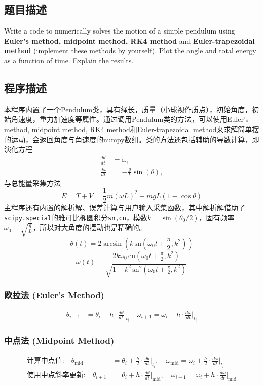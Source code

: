 \subsection{题目描述}
\noindent Write a code to numerically solves the motion of a simple pendulum using \textbf{Euler's method, midpoint method, RK4 method} and \textbf{Euler-trapezoidal method} (implement these methods by yourself). Plot the angle and total energy as a function of time. Explain the results.

\subsection{程序描述}
本程序内置了一个Pendulum类，具有绳长，质量（小球视作质点），初始角度，初始角速度，重力加速度等属性。通过调用Pendulum类的方法，可以使用Euler's method, midpoint method, RK4 method和Euler-trapezoidal method来求解简单摆的运动，会返回角度与角速度的numpy数组。类的方法还包括辅助的导数计算，即演化方程
\[
\begin{aligned}
\frac{d\theta}{dt} &= \omega, \\
\frac{d\omega}{dt} &= -\frac{g}{L} \sin(\theta),
\end{aligned}
\]
与总能量采集方法
\[
E = T + V = \frac{1}{2} m (\omega L)^2+ m g L (1 - \cos\theta)
\]
主程序还有内置的解析解、误差计算与用户输入采集函数，其中解析解借助了\texttt{scipy.special}的雅可比椭圆积分\texttt{sn,cn}，模数$k = \sin(\theta_0/2)$，固有频率$\omega_0 = \sqrt{\frac{g}{L}}$，所以对大角度的摆动也是精确的。
\[
\theta(t) = 2 \arcsin\left(k \, \text{sn}(\omega_0 t + \frac{\pi}{2}, k^2)\right)
\]
\[
\omega(t) = \frac{2 k \omega_0 \, \text{cn}(\omega_0 t + \frac{\pi}{2}, k^2)}{\sqrt{1 - k^2 \, \text{sn}^2(\omega_0 t + \frac{\pi}{2}, k^2)}}
\]

\subsubsection{欧拉法 (Euler’s Method)}

\[
\begin{aligned}
\theta_{i+1} &= \theta_i + h \cdot \frac{d\theta}{dt} \bigg|_{t_i} \quad
\omega_{i+1} = \omega_i + h \cdot \frac{d\omega}{dt} \bigg|_{t_i}
\end{aligned}
\]

\subsubsection{中点法 (Midpoint Method)}

\[
\begin{aligned}
\text{计算中点值:} \quad
\theta_{\text{mid}} &= \theta_i + \frac{h}{2} \cdot \frac{d\theta}{dt} \bigg|_{t_i}, \quad
\omega_{\text{mid}} = \omega_i + \frac{h}{2} \cdot \frac{d\omega}{dt} \bigg|_{t_i} \\
\text{使用中点斜率更新:} \quad
\theta_{i+1} &= \theta_i + h \cdot \frac{d\theta}{dt} \bigg|_{\text{mid}}, \quad
\omega_{i+1} = \omega_i + h \cdot \frac{d\omega}{dt} \bigg|_{\text{mid}}
\end{aligned}
\]

